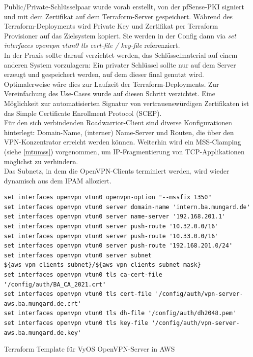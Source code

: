 Public/Private-Schlüsselpaar wurde vorab erstellt, von der pfSense-PKI signiert und mit dem Zertifikat auf dem Terraform-Server gespeichert. Während des Terraform-\gls{Deployment}s wird Private Key und Zertifikat per Terraform Provisioner auf das Zielsystem kopiert. Sie werden in der Config dann via \textit{set interfaces openvpn vtun0 tls cert-file / key-file} referenziert.\\
In der Praxis sollte darauf verzichtet werden, das Schlüsselmaterial \glqq auf einem anderen System vorzulagern\grqq{}: Ein privater Schlüssel sollte nur auf dem Server erzeugt und gespeichert werden, auf dem dieser final genutzt wird. Optimalerweise wäre dies zur Laufzeit der Terraform-\gls{Deployment}s. Zur Vereinfachung des Use-Cases wurde auf diesen Schritt verzichtet. Eine Möglichkeit zur automatisierten Signatur von vertrauenswürdigen Zertifikaten ist das Simple Certificate Enrollment Protocol (SCEP)\cite[S.554]{Schmeh2013}.\\
Für den sich verbindenden Roadwarrior-Client sind diverse Konfigurationen hinterlegt: Domain-Name, (interner) Name-Server und Routen, die über den VPN-Konzentrator erreicht werden können.
Weiterhin wird ein MSS-Clamping (siehe \ref{mtumss}) vorgenommen, um IP-Fragmentierung von TCP-Applikationen möglichst zu verhindern.\\
Das Subnetz, in dem die OpenVPN-Clients terminiert werden, wird wieder dynamisch aus dem IPAM alloziert.
\begin{listing}[h]
\begin{verbatim}
set interfaces openvpn vtun0 openvpn-option "--mssfix 1350"
set interfaces openvpn vtun0 server domain-name 'intern.ba.mungard.de'
set interfaces openvpn vtun0 server name-server '192.168.201.1'
set interfaces openvpn vtun0 server push-route '10.32.0.0/16'
set interfaces openvpn vtun0 server push-route '10.33.0.0/16'
set interfaces openvpn vtun0 server push-route '192.168.201.0/24'
set interfaces openvpn vtun0 server subnet ${aws_vpn_clients_subnet}/${aws_vpn_clients_subnet_mask}
set interfaces openvpn vtun0 tls ca-cert-file '/config/auth/BA_CA_2021.crt'
set interfaces openvpn vtun0 tls cert-file '/config/auth/vpn-server-aws.ba.mungard.de.crt'
set interfaces openvpn vtun0 tls dh-file '/config/auth/dh2048.pem'
set interfaces openvpn vtun0 tls key-file '/config/auth/vpn-server-aws.ba.mungard.de.key'
\end{verbatim}
\caption{Terraform Template für VyOS OpenVPN-Server in AWS}
\label{vpn-c2s-server-config}
\end{listing}

